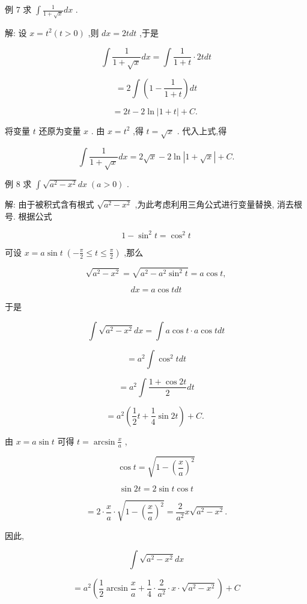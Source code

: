 \documentclass[lang=cn,newtx,12pt,scheme=chinese]{elegantbook}
\begin{document}
例 7 求 \(\int \frac{1}{1 + \sqrt{x}}{dx}\) .

解: 设 \(x = {t}^{2}\left( {t > 0}\right)\) ,则 \({dx} = {2tdt}\) ,于是

\[
\int \frac{1}{1 + \sqrt{x}}{dx} = \int \frac{1}{1 + t} \cdot {2tdt}
\]

\[
= 2\int \left( {1 - \frac{1}{1 + t}}\right) {dt}
\]

\[
= {2t} - 2\ln \left| {1 + t}\right| + C\text{. }
\]

将变量 \(t\) 还原为变量 \(x\) . 由 \(x = {t}^{2}\) ,得 \(t = \sqrt{x}\) . 代入上式,得

\[
\int \frac{1}{1 + \sqrt{x}}{dx} = 2\sqrt{x} - 2\ln \left| {1 + \sqrt{x}}\right| + C.
\]

例 8 求 \(\int \sqrt{{a}^{2} - {x}^{2}}{dx}\;\left( {a > 0}\right)\) .

解: 由于被积式含有根式 \(\sqrt{{a}^{2} - {x}^{2}}\) ,为此考虑利用三角公式进行变量替换, 消去根号. 根据公式

\[
1 - {\sin }^{2}t = {\cos }^{2}t
\]

可设 \(x = a\sin t\;\left( {-\frac{\pi }{2} \leq t \leq \frac{\pi }{2}}\right)\) ,那么

\[
\sqrt{{a}^{2} - {x}^{2}} = \sqrt{{a}^{2} - {a}^{2}{\sin }^{2}t} = a\cos t,
\]

\[
{dx} = a\cos {tdt}
\]

于是

\[
\int \sqrt{{a}^{2} - {x}^{2}}{dx} = \int a\cos t \cdot a\cos {tdt}
\]

\[
= {a}^{2}\int {\cos }^{2}{tdt}
\]

\[
= {a}^{2}\int \frac{1 + \cos {2t}}{2}{dt}
\]

\[
= {a}^{2}\left( {\frac{1}{2}t + \frac{1}{4}\sin {2t}}\right) + C\text{. }
\]

由 \(x = a\sin t\) 可得 \(t = \arcsin \frac{x}{a}\) ,

\[
\cos t = \sqrt{1 - {\left( \frac{x}{a}\right) }^{2}}
\]

\[
\sin {2t} = 2\sin t\cos t
\]

\[
= 2 \cdot \frac{x}{a} \cdot \sqrt{1 - {\left( \frac{x}{a}\right) }^{2}} = \frac{2}{{a}^{2}}x\sqrt{{a}^{2} - {x}^{2}}.
\]

因此,

\[
\int \sqrt{{a}^{2} - {x}^{2}}{dx}
\]

\[
= {a}^{2}\left( {\frac{1}{2}\arcsin \frac{x}{a} + \frac{1}{4} \cdot \frac{2}{{a}^{2}} \cdot x \cdot \sqrt{{a}^{2} - {x}^{2}}}\right) + C
\]
\end{document}
